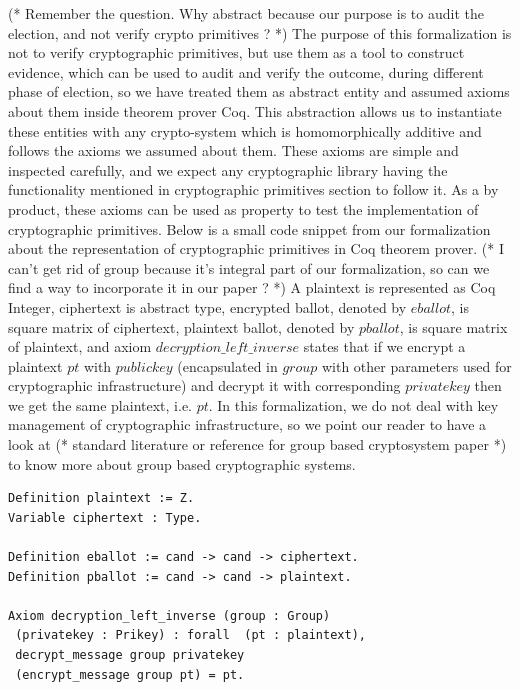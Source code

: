 \documentclass{llncs}
\begin{document}
(* Remember the question. Why abstract because our purpose is to 
   audit the election, and not verify crypto primitives ? *)
The purpose of this formalization is not to verify cryptographic primitives, 
but use them as a tool to construct evidence, which can be used 
to audit and verify the outcome, during different phase 
of election, so we have treated them as abstract entity and assumed 
axioms about them inside theorem prover Coq. This abstraction allows us to
instantiate these entities with any crypto-system which is homomorphically 
additive and follows the axioms we assumed about them. These axioms are 
simple and inspected carefully, and we expect any cryptographic 
library having the functionality mentioned in cryptographic primitives
section to follow it. As a by product, these axioms can be used 
as property to test the  implementation of cryptographic primitives.
 Below is a small code snippet from our formalization
about the representation of cryptographic primitives in Coq theorem prover.
(* I can't get rid of group because it's integral part of our formalization,
 so can we find a way to incorporate it in our paper ? *)
A plaintext is represented as Coq Integer, ciphertext is abstract type, 
 encrypted ballot, denoted by $eballot$,  is square matrix of ciphertext,
 plaintext ballot, denoted by $pballot$,  is square matrix of plaintext,
 and axiom  $decryption\_left\_inverse$ states that if we encrypt 
 a plaintext $pt$ with $publickey$ (encapsulated in $group$ with other
 parameters 
 used for cryptographic infrastructure) and decrypt it with corresponding 
 $privatekey$ then we get the same plaintext, i.e. $pt$.
 In this formalization, we do not deal with key management of
 cryptographic infrastructure, 
 so we point our reader to have a look at (* standard literature or 
 reference for group based cryptosystem paper *)
 to know more about group based cryptographic systems.
   
\begin{lstlisting}[frame=single,basicstyle=\ttfamily\footnotesize]
Definition plaintext := Z.
Variable ciphertext : Type. 

Definition eballot := cand -> cand -> ciphertext.
Definition pballot := cand -> cand -> plaintext.

Axiom decryption_left_inverse (group : Group) 
 (privatekey : Prikey) : forall  (pt : plaintext),
 decrypt_message group privatekey 
 (encrypt_message group pt) = pt.
\end{lstlisting}


\end{document}
